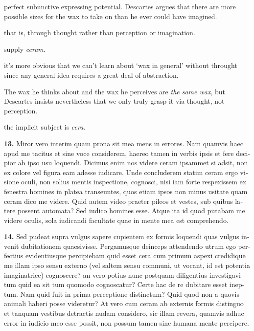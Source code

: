  perfect subunctive expressing potential. Descartes argues that there are more possible sizes for the wax to take on than he ever could have imagined.

 that is, through thought rather than perception or imagination.

 supply \textit{ceram}.

 it's more obvious that we can't learn about `wax in general' without throught since any general idea requires a great deal of abstraction.

 The wax he thinks about and the wax he perceives are \textit{the same wax}, but Descartes insists nevertheless that we only truly grasp it via thought, not perception.

 the implicit subject is \textit{cera}.

\clearpage

\beginnumbering
\pstart
\begin{latin}
    \textenglish{\textbf{13.}} Miror vero interim quam prona sit mea mens in errores. Nam quamvis haec apud me tacitus et sine voce considerem, haereo tamen in verbis ipsis et fere decipior ab ipso usu loquendi. Dicimus enim nos videre ceram ipsammet si adsit, non ex colore vel figura eam adesse iudicare. Unde concluderem statim ceram ergo visione oculi, non solius mentis inspectione, cognosci, nisi iam forte respexissem ex fenestra homines in platea transeuntes, quos etiam ipsos non minus usitate quam ceram dico me videre. Quid autem video praeter pileos et vestes, sub quibus latere possent automata? Sed iudico homines esse. Atque ita id quod putabam me videre oculis, sola iudicandi facultate quae in mente mea est comprehendo.
\end{latin}
\pend
\endnumbering

\beginnumbering
\pstart
\begin{latin}
    \textenglish{\textbf{14.}} Sed pudeat supra vulgus sapere cupientem ex formis loquendi quas vulgus invenit dubitationem quaesivisse. Pergamusque deinceps attendendo utrum ego perfectius evidentiusque percipiebam quid esset cera cum primum aspexi credidique me illam ipso sensu externo (vel saltem sensu communi, ut vocant, id est potentia imaginatrice) cognoscere? an vero potius nunc postquam diligentius investigavi tum quid ea sit tum quomodo cognoscatur? Certe hac de re dubitare esset ineptum. Nam quid fuit in prima perceptione distinctum? Quid quod non a quovis animali haberi posse videretur? At vero cum ceram ab externis formis distinguo et tanquam vestibus detractis nudam considero, sic illam revera, quamvis adhuc error in iudicio meo esse possit, non possum tamen sine humana mente percipere.
\end{latin}
\pend
\endnumbering

